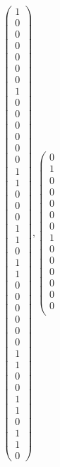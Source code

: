 \documentclass[8pt]{article}
\begin{document}
 \begin{align*} \left(\begin{array}{r}
1 \\
0 \\
0 \\
0 \\
0 \\
0 \\
0 \\
1 \\
0 \\
0 \\
0 \\
0 \\
0 \\
0 \\
1 \\
1 \\
0 \\
0 \\
0 \\
1 \\
1 \\
0 \\
1 \\
1 \\
0 \\
0 \\
0 \\
0 \\
0 \\
0 \\
1 \\
1 \\
0 \\
0 \\
1 \\
1 \\
0 \\
1 \\
1 \\
0
\end{array}\right) ,
 \left(\begin{array}{r}
0 \\
1 \\
0 \\
0 \\
0 \\
0 \\
0 \\
1 \\
0 \\
0 \\
0 \\
0 \\
0 \\
0 \\

\end{array}
\end{align*}
\end{document}

